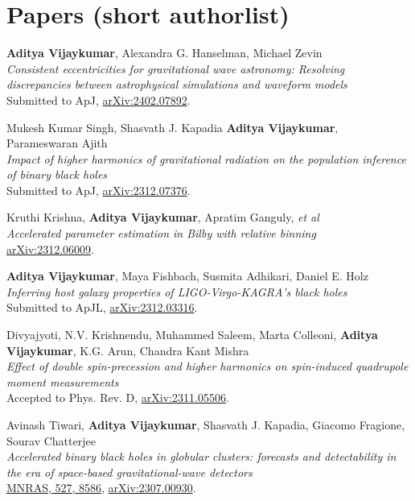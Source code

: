     \section{Papers (short authorlist)}
\begin{etaremune}
	\item
	 \textbf{Aditya Vijaykumar}, Alexandra G. Hanselman, Michael Zevin  \\
	\textit{Consistent eccentricities for gravitational wave astronomy: Resolving discrepancies between astrophysical simulations and waveform models}\\
	Submitted to ApJ, \href{https://arxiv.org/abs/2402.07892}{arXiv:2402.07892}.

	\item
	Mukesh Kumar Singh, Shasvath J. Kapadia \textbf{Aditya Vijaykumar}, Parameswaran Ajith  \\
	\textit{Impact of higher harmonics of gravitational radiation on the population inference of binary black holes}\\
	Submitted to ApJ, \href{https://arxiv.org/abs/2312.07376}{arXiv:2312.07376}.

	\item
	Kruthi Krishna, \textbf{Aditya Vijaykumar}, Apratim Ganguly, \textit{et al}  \\
	\textit{Accelerated parameter estimation in Bilby with relative binning}\\
	\href{https://arxiv.org/abs/2312.06009}{arXiv:2312.06009}.

    \item
	\textbf{Aditya Vijaykumar}, Maya Fishbach, Susmita Adhikari, Daniel E. Holz  \\
	\textit{Inferring host galaxy properties of LIGO-Virgo-KAGRA's black holes
}\\
	Submitted to ApJL, \href{https://arxiv.org/abs/2312.03316}{arXiv:2312.03316}.

	\item
	Divyajyoti, N.V. Krishnendu, Muhammed Saleem, Marta Colleoni, \textbf{Aditya Vijaykumar}, K.G. Arun, Chandra Kant Mishra  \\
	\textit{Effect of double spin-precession and higher harmonics on spin-induced quadrupole moment measurements}\\
	Accepted to Phys. Rev. D, \href{https://arxiv.org/abs/2311.05506}{arXiv:2311.05506}.

	\item
	Avinash Tiwari, \textbf{Aditya Vijaykumar}, Shasvath J. Kapadia, Giacomo Fragione, Sourav Chatterjee  \\
	\textit{Accelerated binary black holes in globular clusters: forecasts and detectability in the era of space-based gravitational-wave detectors}\\
	\href{https://academic.oup.com/mnras/article/527/3/8586/7459933}{MNRAS, 527, 8586}, \href{https://arxiv.org/abs/2307.00930}{arXiv:2307.00930}.


\end{etaremune}
